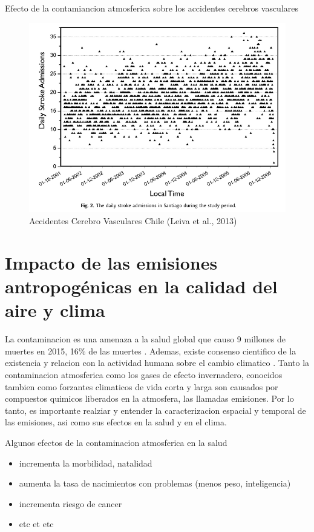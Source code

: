 \documentclass[]{book}
\providecommand{\tightlist}{%
  \setlength{\itemsep}{0pt}\setlength{\parskip}{0pt}}
\begin{document}
Efecto de la contamiancion atmosferica sobre los accidentes cerebros vasculares

\begin{figure}
\includegraphics[width=10.92in]{figs/strokes} \caption{Accidentes Cerebro Vasculares Chile (Leiva et al., 2013)}\label{fig:unnamed-chunk-3}
\end{figure}

\hypertarget{impacto-de-las-emisiones-antropogenicas-en-la-calidad-del-aire-y-clima}{%
\chapter{Impacto de las emisiones antropogénicas en la calidad del aire y clima}\label{impacto-de-las-emisiones-antropogenicas-en-la-calidad-del-aire-y-clima}}

La contaminacion es una amenaza a la salud global que causo 9 millones de muertes en 2015, 16\% de las muertes \citep{landrigan2018lancet}. Ademas, existe consenso cientifico de la existencia y relacion con la actividad humana sobre el cambio climatico \citep{cook2016consensus}. Tanto la contaminacion atmosferica como los gases de efecto invernadero, conocidos tambien como forzantes climaticos de vida corta y larga son causados por compuestos quimicos liberados en la atmosfera, las llamadas emisiones. Por lo tanto, es importante realziar y entender la caracterizacion espacial y temporal de las emisiones, asi como sus efectos en la salud y en el clima.

Algunos efectos de la contaminacion atmosferica en la salud

\begin{itemize}
\tightlist
\item
  incrementa la morbilidad, natalidad
\item
  aumenta la tasa de nacimientos con problemas (menos peso, inteligencia)
\item
  incrementa riesgo de cancer
\item
  etc et etc
\end{itemize}
\end{document}
